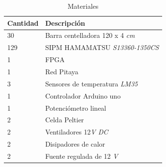 \documentclass[11pt,letterpaper,oneside]{book}
\begin{document}
\begin{table}[htbp]
\begin{center}
\begin{tabular}{|p{2cm}|p{7cm}|}\hline
\hline
Cantidad & Descripción\\
\hline  \hline
30 & Barra centelladora 120 x 4 \textit{cm} \\ \hline
129 & SIPM HAMAMATSU \textit{S13360-1350CS} \\ \hline
1 & FPGA \\ \hline
1 & Red Pitaya\\ \hline
3 & Sensores de temperatura \textit{LM35} \\ \hline
1 & Controlador Arduino uno \\ \hline
1 & Potenciómetro lineal  \\ \hline
2 & Celda Peltier \\ \hline
2 & Ventiladores 12\textit{V DC}\\ \hline
2 & Disipadores de calor  \\ \hline
2 & Fuente regulada de 12 \textit{V} \\ \hline

\end{tabular}
\caption{Materiales}
\label{lista_materiales}
\end{center}
\end{table}
\newpage
\cleardoublepage
{}


\end{document}
